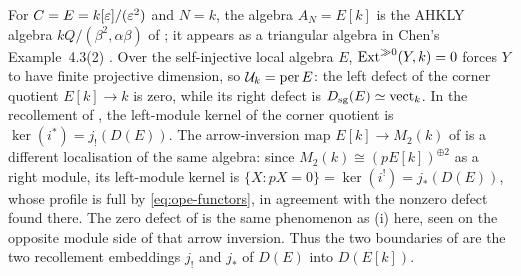 \begin{example}\label{ex:ahkly}
For \(C=E=k[\varepsilon]/(\varepsilon^2)\) and \(N=k\), the algebra \(A_N=E[k]\) is the AHKLY algebra \(kQ/(\beta^2,\alpha\beta)\) of ; it appears as a triangular algebra in Chen's Example~4.3(2) \cite{ChenSchur09}.  Over the self-injective local algebra \(E\), \(\operatorname{Ext}^{\gg0}(Y,k)=0\) forces \(Y\) to have finite projective dimension, so \(\mathcal U_k=\operatorname{per} E\): the left defect of the corner quotient \(E[k]\to k\) is zero, while its right defect is \(D_{\mathrm{sg}}(E)\simeq\operatorname{vect}_k\).  In the recollement of , the left-module kernel of the corner quotient is \(\ker(i^*)=j_!(D(E))\).  The arrow-inversion map \(E[k]\to M_2(k)\) of  is a different localisation of the same algebra: since \(M_2(k)\cong(pE[k])^{\oplus2}\) as a right module, its left-module kernel is \(\{X:pX=0\}=\ker(i^!)=j_*(D(E))\), whose profile is full by \eqref{eq:ope-functors}, in agreement with the nonzero defect found there.  The zero defect of  is the same phenomenon as (i) here, seen on the opposite module side of that arrow inversion.  Thus the two boundaries of  are the two recollement embeddings \(j_!\) and \(j_*\) of \(D(E)\) into \(D(E[k])\).
\end{example}
